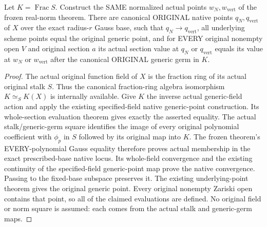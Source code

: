 \begin{lemma}
\label{lem:gauss-native-original-stalk-point-sequence}
\leanok
\leavevmode\par
Let $K=\operatorname{Frac}S$. Construct the SAME normalized actual points
$w_N,w_{\mathrm{vert}}$ of the frozen real-norm theorem. There are canonical ORIGINAL
native points $q_N,q_{\mathrm{vert}}$ of $X$ over the exact radius-$r$ Gauss base, such
that $q_N\to q_{\mathrm{vert}}$, all underlying scheme points equal the original generic
point, and for EVERY original nonempty open $V$ and original section $a$
its actual section value at $q_N$ or $q_{\mathrm{vert}}$ equals its value at $w_N$ or
$w_{\mathrm{vert}}$ after the canonical ORIGINAL generic germ in $K$.
\end{lemma}
\begin{proof}
The actual original function field of $X$ is the fraction ring of its
actual original stalk $S$. Thus the canonical fraction-ring algebra
isomorphism $K\simeq_S K(X)$ is internally available. Give $K$ the inverse
actual generic-field action and apply the existing specified-field native
generic-point construction. Its whole-section evaluation theorem gives
exactly the asserted equality. The actual stalk/generic-germ square
identifies the image of every original polynomial coefficient with
$\phi_p$ in $S$ followed by its original map into $K$. The frozen theorem's
EVERY-polynomial Gauss equality therefore proves actual membership in the
exact prescribed-base native locus. Its whole-field convergence and the
existing continuity of the specified-field generic-point map prove the
native convergence. Passing to the fixed-base subspace preserves it.
The existing underlying-point theorem gives the original generic point.
Every original nonempty Zariski open contains that point, so all of the
claimed evaluations are defined. No original field or norm square is
assumed: each comes from the actual stalk and generic-germ maps.
\end{proof}

